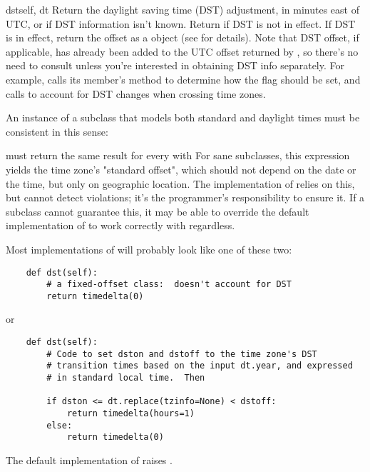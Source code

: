 \begin{methoddesc}[tzinfo]{dst}{self, dt}
  Return the daylight saving time (DST) adjustment, in minutes east of
  UTC, or  if DST information isn't known.  Return
   if DST is not in effect.
  If DST is in effect, return the offset as a
   object (see  for details).
  Note that DST offset, if applicable, has
  already been added to the UTC offset returned by
  , so there's no need to consult 
  unless you're interested in obtaining DST info separately.  For
  example,  calls its 
  member's  method to determine how the
   flag should be set, and
   calls  to account for
  DST changes when crossing time zones.

  An instance  of a  subclass that models both
  standard and daylight times must be consistent in this sense:


  must return the same result for every  
  with   For sane 
  subclasses, this expression yields the time zone's "standard offset",
  which should not depend on the date or the time, but only on geographic
  location.  The implementation of  relies
  on this, but cannot detect violations; it's the programmer's
  responsibility to ensure it.  If a  subclass cannot
  guarantee this, it may be able to override the default implementation
  of  to work correctly with 
  regardless.

  Most implementations of  will probably look like one
  of these two:

\begin{verbatim}
    def dst(self):
        # a fixed-offset class:  doesn't account for DST
        return timedelta(0)
\end{verbatim}

  or

\begin{verbatim}
    def dst(self):
        # Code to set dston and dstoff to the time zone's DST
        # transition times based on the input dt.year, and expressed
        # in standard local time.  Then

        if dston <= dt.replace(tzinfo=None) < dstoff:
            return timedelta(hours=1)
        else:
            return timedelta(0)
\end{verbatim}

  The default implementation of  raises
  .
\end{methoddesc}

